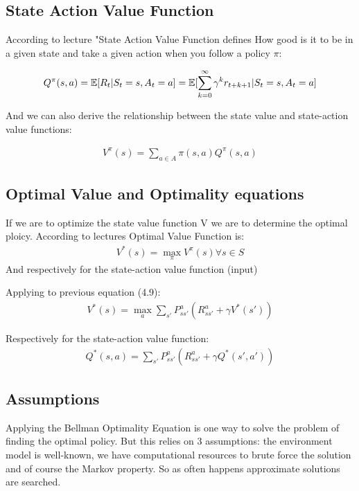 \subsection{State Action Value Function}
According to lecture "State Action Value Function defines How good is it to be in a given state and take a given action when you follow a policy $\pi$:

\begin{align}
    Q^{\pi}(s, a) = \operatorname{\mathbb{E}}[R_t | S_t = s, A_t = a] = \operatorname{\mathbb{E}}[\sum^{\infty}_{k=0} \gamma^k r_{t+k+1} | S_t = s, A_t = a]
\end{align}

And we can also derive the relationship between the state value and state-action value functions:

\begin{align}
    V^{\pi}(s) = \sum_{a \in A} \pi(s, a) Q^{\pi}(s, a) 
\end{align}

\subsection{Optimal Value and Optimality equations}
If we are to optimize the state value function V we are to determine the optimal ploicy. According to lectures Optimal Value Function is:
\begin{align}
    V^*(s) = \max_{\pi} V^{\pi}(s)   \forall s \in S
\end{align}
And respectively for the state-action value function (input) 

Applying to previous equation (4.9):
\begin{align}
    V^*(s) = \max_{a}\sum_{s'} P^{a}_{ss'} (R^{a}_{ss'} + \gamma V^{*}(s'))
\end{align}

Respectively for the state-action value function:
\begin{align}
    Q^*(s, a) = \sum_{s'} P^{a}_{ss'} (R^{a}_{ss'} + \gamma Q^{*}(s', a'))
\end{align}

\subsection{Assumptions}

Applying the Bellman Optimality Equation is one way to solve the problem of finding the optimal policy. But this relies on 3 assumptions: the environment model is well-known, we have computational resources to brute force the solution and of course the Markov property. So as often happens approximate solutions are searched.

